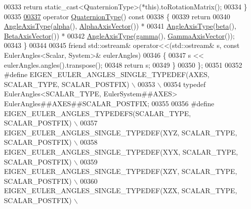 \begin{DoxyCode}
00333         \textcolor{keywordflow}{return} \textcolor{keyword}{static\_cast<}QuaternionType\textcolor{keyword}{>}(*this).toRotationMatrix();
00334       \}
00335 
\hyperlink{class_eigen_1_1_euler_angles_aa4ccd4b412c3146a9dd58a884eaea42e}{00337}       \textcolor{keyword}{operator} \hyperlink{class_eigen_1_1_euler_angles_adf351608cad15e660279f7323e516d3a}{QuaternionType}()\textcolor{keyword}{ const}
00338 \textcolor{keyword}{      }\{
00339         \textcolor{keywordflow}{return}
00340           \hyperlink{class_eigen_1_1_euler_angles_a0bc2416b52b29a213eccad8a43ce61a6}{AngleAxisType}(\hyperlink{class_eigen_1_1_euler_angles_a6146f78ee0fb9d9a7d685a4654066825}{alpha}(), \hyperlink{class_eigen_1_1_euler_angles_a33d034ea7e8cac1f4d7c329d741b9a59}{AlphaAxisVector}()) *
00341           \hyperlink{class_eigen_1_1_euler_angles_a0bc2416b52b29a213eccad8a43ce61a6}{AngleAxisType}(\hyperlink{class_eigen_1_1_euler_angles_a1bf59f8acaed985964c98c1f59d8f5ab}{beta}(), \hyperlink{class_eigen_1_1_euler_angles_aede24ef1ffc5913f2eb6539c1f1b9dc4}{BetaAxisVector}())   *
00342           \hyperlink{class_eigen_1_1_euler_angles_a0bc2416b52b29a213eccad8a43ce61a6}{AngleAxisType}(\hyperlink{class_eigen_1_1_euler_angles_aa75a5f16105d96eedf81bf9f8e789e21}{gamma}(), \hyperlink{class_eigen_1_1_euler_angles_a77ea78dac1d599353e2a87d95cc6f1d4}{GammaAxisVector}());
00343       \}
00344       
00345       \textcolor{keyword}{friend} std::ostream& operator<<(std::ostream& s, const EulerAngles<Scalar, System>& eulerAngles)
00346       \{
00347         s << eulerAngles.angles().transpose();
00348         \textcolor{keywordflow}{return} s;
00349       \}
00350   \};
00351 
00352 \textcolor{preprocessor}{#define EIGEN\_EULER\_ANGLES\_SINGLE\_TYPEDEF(AXES, SCALAR\_TYPE, SCALAR\_POSTFIX) \(\backslash\)}
00353 \textcolor{preprocessor}{ \(\backslash\)}
00354 \textcolor{preprocessor}{  typedef EulerAngles<SCALAR\_TYPE, EulerSystem##AXES> EulerAngles##AXES##SCALAR\_POSTFIX;}
00355 
00356 \textcolor{preprocessor}{#define EIGEN\_EULER\_ANGLES\_TYPEDEFS(SCALAR\_TYPE, SCALAR\_POSTFIX) \(\backslash\)}
00357 \textcolor{preprocessor}{  EIGEN\_EULER\_ANGLES\_SINGLE\_TYPEDEF(XYZ, SCALAR\_TYPE, SCALAR\_POSTFIX) \(\backslash\)}
00358 \textcolor{preprocessor}{  EIGEN\_EULER\_ANGLES\_SINGLE\_TYPEDEF(XYX, SCALAR\_TYPE, SCALAR\_POSTFIX) \(\backslash\)}
00359 \textcolor{preprocessor}{  EIGEN\_EULER\_ANGLES\_SINGLE\_TYPEDEF(XZY, SCALAR\_TYPE, SCALAR\_POSTFIX) \(\backslash\)}
00360 \textcolor{preprocessor}{  EIGEN\_EULER\_ANGLES\_SINGLE\_TYPEDEF(XZX, SCALAR\_TYPE, SCALAR\_POSTFIX) \(\backslash\)}

\end{DoxyCode}
